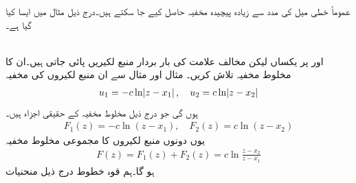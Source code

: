 عموماً خطی میل کی مدد سے زیادہ پیچیدہ مخفیہ حاصل کیے جا سکتے ہیں۔درج ذیل مثال میں ایسا کیا گیا ہے۔

\quad {}\\
 اور  پر یکساں لیکن مخالف علامت کی بار بردار منبع لکیریں پائی جاتی ہیں۔ان کا مخلوط مخفیہ تلاش کریں۔ مثال  اور مثال  سے ان منبع لکیروں کی مخفیہ
\begin{align*}
u_1=-c\ln\abs{z-x_1},\quad u_2=c\ln\abs{z-x_2}
\end{align*}
ہوں گی جو درج ذیل مخلوط مخفیہ کے حقیقی اجزاء ہیں۔
\begin{align*}
F_1(z)=-c\ln(z-x_1),\quad F_2(z)=c\ln(z-x_2)
\end{align*} 
یوں دونوں منبع لکیروں کا مجموعی مخلوط مخفیہ  
\begin{align}\label{مساوات_مخفی_قوہ_مثال_مخفی_قوہ_جوڑی_دار}
F(z)=F_1(z)+F_2(z)=c\ln\frac{z-x_2}{z-x_1}
\end{align}
ہو گا۔ہم قوہ خطوط درج ذیل منحنیات

